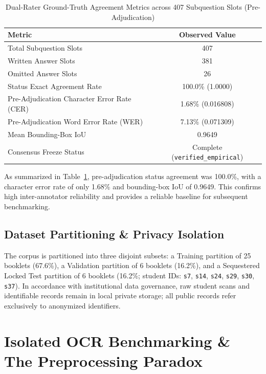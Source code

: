\documentclass[journal]{IEEEtran}
\begin{document}
\begin{table}[t]
\centering
\caption{Dual-Rater Ground-Truth Agreement Metrics across 407 Subquestion Slots (Pre-Adjudication)}
\label{tab:dual_rater}
\begin{tabular}{lc}
\toprule
\textbf{Metric} & \textbf{Observed Value} \\
\midrule
Total Subquestion Slots & 407 \\
Written Answer Slots & 381 \\
Omitted Answer Slots & 26 \\
Status Exact Agreement Rate & 100.0\% (1.0000) \\
Pre-Adjudication Character Error Rate (CER) & 1.68\% (0.016808) \\
Pre-Adjudication Word Error Rate (WER) & 7.13\% (0.071309) \\
Mean Bounding-Box IoU & 0.9649 \\
Consensus Freeze Status & Complete (\texttt{verified\_empirical}) \\
\bottomrule
\end{tabular}
\end{table}

As summarized in Table~\ref{tab:dual_rater}, pre-adjudication status agreement was 100.0\%, with a character error rate of only 1.68\% and bounding-box IoU of 0.9649. This confirms high inter-annotator reliability and provides a reliable baseline for subsequent benchmarking.

\subsection{Dataset Partitioning \& Privacy Isolation}
The corpus is partitioned into three disjoint subsets: a Training partition of 25 booklets (67.6\%), a Validation partition of 6 booklets (16.2\%), and a Sequestered Locked Test partition of 6 booklets (16.2\%; student IDs: \texttt{s7}, \texttt{s14}, \texttt{s24}, \texttt{s29}, \texttt{s30}, \texttt{s37}). In accordance with institutional data governance, raw student scans and identifiable records remain in local private storage; all public records refer exclusively to anonymized identifiers.

\section{Isolated OCR Benchmarking \& The Preprocessing Paradox}
\end{document}
